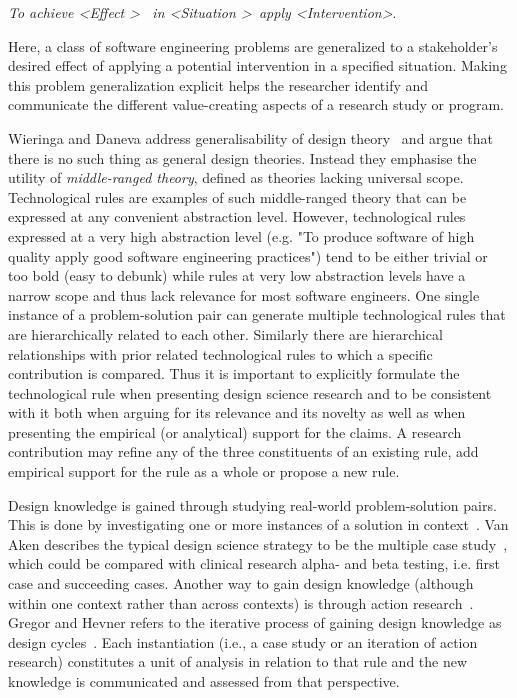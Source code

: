 \documentclass[graybox]{svmult}
\begin{document}
\begin{center}{\emph{To achieve \textless Effect \textgreater ~ in \textless Situation \textgreater~apply \textless Intervention\textgreater}.} 
\newline
\end{center}

Here, a class of software engineering problems are generalized to a stakeholder's desired effect of applying a potential intervention in a specified situation. 
Making this problem generalization explicit helps the researcher identify and communicate the different value-creating aspects of a research study or program.


Wieringa and Daneva address generalisability of design theory~\cite{wieringa_six_2015} and argue that there is no such thing as general design theories. Instead they emphasise the utility of \emph{middle-ranged theory}, defined as theories lacking universal scope. 
Technological rules are examples of such middle-ranged theory that can be expressed at any convenient abstraction level. However, technological rules expressed at a very high abstraction level (e.g. "To produce software of high quality apply good software engineering practices") tend to be either trivial or too bold (easy to debunk) while rules at very low abstraction levels have a narrow scope and thus lack relevance for most software engineers. One single instance of a problem-solution pair can generate multiple technological rules that are hierarchically related to each other. Similarly there are hierarchical relationships with prior related technological rules to which a specific contribution is compared.
Thus it is important to explicitly formulate the technological rule when presenting design science research and to be consistent with it both when arguing for its relevance and its novelty as well as when presenting the empirical (or analytical) support for the claims.  A research contribution may refine any of the three constituents of an existing rule, add empirical support for the rule as a whole or propose a new rule.

Design knowledge is gained through studying real-world problem-solution pairs. This is done by investigating one or more instances of a solution in context~\cite{wieringa_what_2014}. Van Aken describes the typical design science strategy to be the multiple case study~\cite{van_aken_management_2004}, which could be compared with clinical research alpha- and beta testing, i.e. first case and succeeding cases.
Another way to gain design knowledge (although within one context rather than across contexts) is through action research~\cite{wieringa_technical_2012}. Gregor and Hevner refers to the iterative process of gaining design knowledge as design cycles~\cite{gregor_positioning_2013}. Each instantiation (i.e., a case study or an iteration of action research) constitutes a unit of analysis in relation to that rule and the new knowledge is communicated and assessed from that perspective. 
\end{document}

